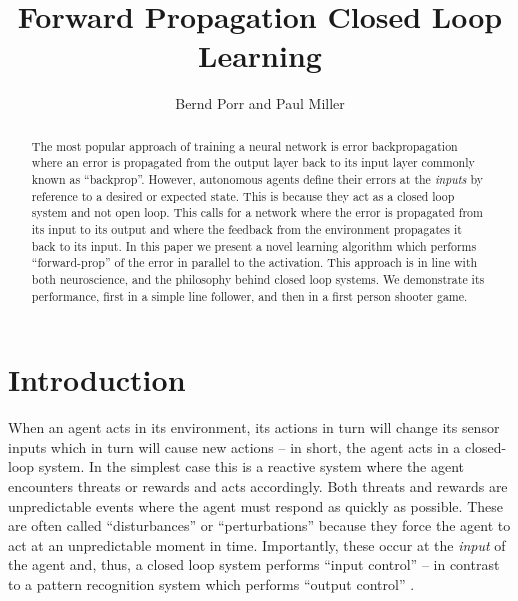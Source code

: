 \documentclass[Afour,sageh,times]{sagej}
\begin{document}

\title{Forward Propagation Closed Loop Learning}

\author{Bernd Porr and Paul Miller}




\begin{abstract}
  The most popular approach of training a neural network is
  error backpropagation where an error is propagated from the
  output layer back to its input layer commonly known as ``backprop''.
  However, autonomous agents define their errors at the
  \textsl{inputs} by reference to a desired or expected state. This is
  because they act as a closed loop system and not open loop. This
  calls for a network where the error is propagated from its input to
  its output and where the feedback from the environment propagates it
  back to its input. In this paper we present a novel learning
  algorithm which performs ``forward-prop'' of the error in parallel
  to the activation. This approach is in line with both neuroscience,
  and the philosophy behind closed loop systems. We demonstrate its
  performance, first in a simple line follower, and then in a first
  person shooter game.
\end{abstract}


\maketitle

\section{Introduction}
When an agent acts in its environment, its actions in turn will change
its sensor inputs which in turn will cause new actions -- in short,
the agent acts in a closed-loop system. In the simplest case this is a
reactive system where the agent encounters threats or rewards and acts
accordingly. Both threats and rewards are unpredictable events where
the agent must respond as quickly as possible. These are often called
``disturbances'' \cite{Phillips2000} or ``perturbations''
\cite{Maturana80} because they force the agent to act at an
unpredictable moment in time. Importantly, these occur at the
\textsl{input} of the agent and, thus, a closed loop system performs
``input control'' \cite{Ashby72,Phillips2000} -- in contrast to a
pattern recognition system which performs ``output control''
\cite{Phillips2000,Porr2005kyb}.
\end{document}
